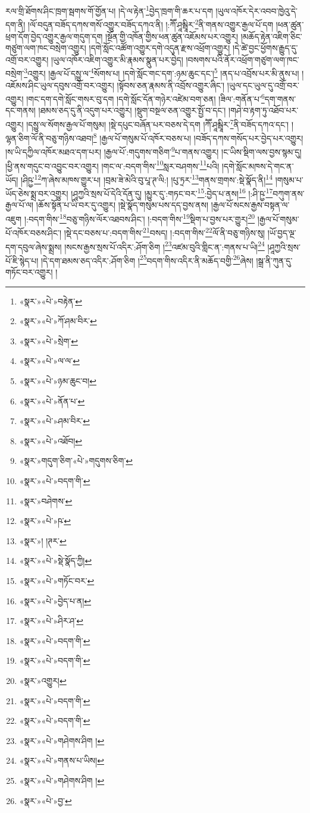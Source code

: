 རལ་གྲི་ཐོགས་ཤིང་ཁྲག་སྦགས་གོ་གྱོན་པ། །དེ་ལ་རྟེན་\footnote{«སྣར་»«པེ་»བརྟེན་}བྱེད་ཁྲག་གི་ཆར་པ་དག །ཡུལ་འཁོར་དེར་འབབ་ཁྱེའུ་དེ་དག་ནི། །ལོ་བདུན་བཟོད་དཀས་གསོ་འགྱུར་བཟོད་དཀའ་ནི། །:ཀཽ་ཤཱམྦཱིར་\footnote{«སྣར་»«པེ་»ཀོ་ཤམ་བིར་}ནི་གནས་འགྱུར་རྒྱལ་པོ་དག །ཕན་ཚུན་ཕྲག་དོག་བྱེད་འགྱུར་རྒྱལ་གདུག་དག །སྔོན་གྱི་འཁོན་གྱིས་ཕན་ཚུན་འཇོམས་པར་འགྱུར། །མཆོད་རྟེན་འཇིག་ཅིང་གཙུག་ལག་ཁང་བསྲེག་འགྱུར། །དགེ་སློང་འཚོག་འགྱུར་དགེ་འདུན་རྫས་འཕྲོག་འགྱུར། །དེ་ཚེ་བྱང་ཕྱོགས་རྒྱུད་དུ་འགྲོ་བར་འགྱུར། །ཡུལ་འཁོར་འཇིག་འགྱུར་མི་རྣམས་སྣུན་པར་བྱེད། །བསགས་པའི་ནོར་འཕྲོག་གཙུག་ལག་ཁང་བསྲེག་\footnote{«སྣར་»«པེ་»སྲེག་}འགྱུར། །རྒྱལ་པོ་དསྱུ་ལ་\footnote{«སྣར་»«པེ་»ལ་ལ་}སོགས་པ། །དགེ་སློང་གང་དག་:ཉམ་ཆུང་དང་།\footnote{«སྣར་»«པེ་»ཉམ་ཆུང་བ།} །ནད་པ་འབྲོས་པར་མི་ནུས་པ། །འཇོམས་ཤིང་ཡུལ་དབུས་འགྲོ་བར་འགྱུར། །སྟོབས་ཅན་རྣམས་ནི་འབྲོས་འགྱུར་ཞིང་། །ཡུལ་དང་ཡུལ་དུ་འགྲོ་བར་འགྱུར། །གང་དག་དགེ་སློང་གསར་བུ་དག །དགེ་སློང་དོན་གཉེར་འཛེམ་བག་ཅན། །ཟིལ་:གནོན་པ་\footnote{«སྣར་»«པེ་»ནོན་པ་}དག་གནས་དང་གནས། །ཐམས་ཅད་དུ་ནི་འདུག་པར་འགྱུར། །སྡུག་བསྔལ་ཅན་འགྱུར་སྤྱོ་བ་དང་། །གཤེ་བ་རྟག་ཏུ་འཐོབ་པར་འགྱུར། །དསྱུ་ལ་སོགས་རྒྱལ་པོ་གསུམ། །སྡེ་དཔུང་བཞོན་པར་བཅས་དེ་དག །ཀཽ་ཤཱམྦཱིར་\footnote{«སྣར་»«པེ་»ཤམ་བིར་}ནི་བཟོད་དཀའ་དང་། །ལྷན་ཅིག་ལོ་ནི་བཅུ་གཉིས་འཐབ།\footnote{«སྣར་»«པེ་»འཐོབ།} །རྒྱལ་པོ་གསུམ་པོ་འཁོར་བཅས་པ། །བཟོད་དཀས་གསོད་པར་བྱེད་པར་འགྱུར། །ས་ཡི་དཀྱིལ་འཁོར་མཐའ་དག་པར། །རྒྱལ་པོ་:གདུགས་གཅིག་\footnote{«སྣར་»གདུག་ཅིག་«པེ་»གདུགས་ཅིག་}པ་གནས་འགྱུར། །ང་ཡིས་སྡིག་ལས་བྱས་སྙམ་དུ། །ཕྱི་ནས་གདུང་བ་འབྱུང་བར་འགྱུར། །གང་ལ་:བདག་གིས་\footnote{«སྣར་»«པེ་»བདག་གི་}སླར་བཤགས་\footnote{«སྣར་»བཤེགས་}པའི། །དགེ་སློང་མཁས་དེ་གང་ན་ཡོད། །ཤིཥྱ་\footnote{«སྣར་»«པེ་»ཥ་}ཀ་ཞེས་མཁས་གྱུར་པ། །བྲམ་ཟེ་མེའི་བུ་པཱ་ཊ་ལི:། །པུ་ཏྲར་\footnote{«སྣར་»། །ཊར་}གནས་གྲགས་:སྡེ་སྣོད་ནི།\footnote{«སྣར་»«པེ་»སྡེ་སྣོད་ཀྱི།} །གསུམ་པ་ཡོད་ཅེས་སྨྲ་བར་འགྱུར། །ཤཱཀྱའི་སྲས་པོ་དེའི་དོན་དུ། །མྱུར་དུ་:གཏང་བར་\footnote{«སྣར་»«པེ་»གཏོང་བར་}:བྱེད་པ་ནས།\footnote{«སྣར་»«པེ་»བྱེད་པ་ན།} །:ཤི་ཥྱ་\footnote{«སྣར་»«པེ་»ཤིར་ཤ་}བཀུག་ནས་རྒྱལ་པོ་ལ། །ཆོས་སྟོན་པ་ཡི་བར་དུ་འགྱུར། །སྡེ་སྣོད་གསུམ་པས་དད་བྱས་ནས། །རྒྱལ་པོ་སངས་རྒྱས་བསྟན་ལ་འཇུག །:བདག་གིས་\footnote{«སྣར་»«པེ་»བདག་གི་}བཅུ་གཉིས་ལོར་འཐབས་ཤིང་། །:བདག་གིས་\footnote{«སྣར་»«པེ་»བདག་གི་}སྡིག་པ་བྱས་པར་གྱུར།\footnote{«སྣར་»འགྱུར།} །རྒྱལ་པོ་གསུམ་པོ་འཁོར་བཅས་ཤིང་། །སྡེ་དང་བཅས་པ་:བདག་གིས་\footnote{«སྣར་»«པེ་»བདག་གི་}བསད། །:བདག་གིས་\footnote{«སྣར་»«པེ་»བདག་གི་}ལོ་ནི་བཅུ་གཉིས་སུ། །ཡོ་བྱད་ལྔ་དག་དབུལ་ཞེས་སྨྲས། །སངས་རྒྱས་སྲས་པོ་འདིར་:ཤོག་ཅིག །\footnote{«སྣར་»«པེ་»གཤེགས་ཤིག །}འཛམ་བུའི་གླིང་ན་:གནས་པ་ཡི།\footnote{«སྣར་»«པེ་»གནས་པ་ཡིས།} །ཤཱཀྱའི་སྲས་པོ་ཇི་སྙེད་པ། །དེ་དག་ཐམས་ཅད་འདིར་:ཤོག་ཅིག །\footnote{«སྣར་»«པེ་»གཤེགས་ཤིག །}བདག་གིས་འདིར་ནི་མཆོད་བགྱི་\footnote{«སྣར་»«པེ་»བྱ་}ཞེས། །སྒྲ་ནི་ཀུན་དུ་གཏོང་བར་འགྱུར། །
